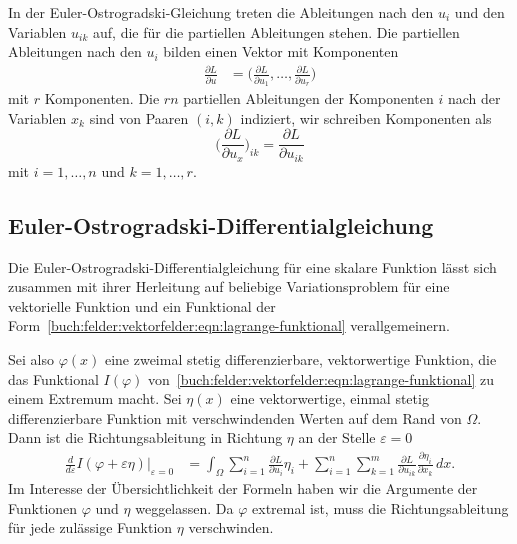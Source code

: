 In der Euler-Ostrogradski-Gleichung treten die Ableitungen nach
den $u_i$ und den Variablen $u_{ik}$ auf, die für die partiellen
Ableitungen stehen.
Die partiellen Ableitungen nach den $u_i$ bilden einen Vektor
mit Komponenten
\begin{align*}
\frac{\partial L}{\partial u}
&=
\biggl(
\frac{\partial L}{\partial u_1}
,\dots,
\frac{\partial L}{\partial u_r}
\biggr)
\end{align*}
mit $r$ Komponenten.
Die $rn$ partiellen Ableitungen der Komponenten $i$ nach der Variablen $x_k$
sind von Paaren $(i,k)$ indiziert, wir schreiben Komponenten als
\[
\biggl(
\frac{\partial L}{\partial u_x}
\biggr)_{ik}
=
\frac{\partial L}{\partial u_{ik}}
\]
mit $i=1,\dots,n$ und $k=1,\dots,r$.

%
%
\subsection{Euler-Ostrogradski-Differentialgleichung
\label{buch:felder:vektorfelder:subsection:euler-ostrogradski-dgl}}
Die Euler-Ostrogradski-Differentialgleichung für eine skalare
Funktion lässt sich zusammen mit ihrer Herleitung auf beliebige 
Variationsproblem für eine vektorielle Funktion und ein Funktional
der Form~\eqref{buch:felder:vektorfelder:eqn:lagrange-funktional}
verallgemeinern.

Sei also $\varphi(x)$ eine zweimal stetig differenzierbare, vektorwertige
Funktion, die das Funktional $I(\varphi)$
von~\eqref{buch:felder:vektorfelder:eqn:lagrange-funktional}
zu einem Extremum macht.
Sei $\eta(x)$ eine vektorwertige, einmal stetig differenzierbare
Funktion mit verschwindenden Werten auf dem Rand von $\Omega$.
Dann ist die Richtungsableitung in Richtung $\eta$ an der Stelle
$\varepsilon=0$
\begin{align}
\frac{d}{d\varepsilon}
I(\varphi+\varepsilon\eta)
\bigg|_{\varepsilon=0}
&=
\int_{\Omega}
\sum_{i=1}^n
\frac{\partial L}{\partial u_i}
\eta_i
+
\sum_{i=1}^n
\sum_{k=1}^m
\frac{\partial L}{\partial u_{ik}} \frac{\partial \eta_i}{\partial x_k}
\,dx.
\label{buch:felder:vektorfelder:eqn:richtungsableitung}
\end{align}
Im Interesse der Übersichtlichkeit der Formeln haben wir die Argumente
der Funktionen $\varphi$ und $\eta$ weggelassen.
Da $\varphi$ extremal ist, muss die Richtungsableitung für jede 
zulässige Funktion $\eta$ verschwinden.

